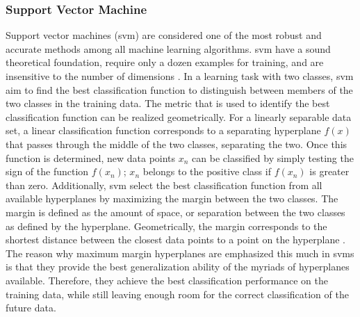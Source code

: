 \subsubsection{Support Vector Machine}
Support vector machines (\gls{svm}) are considered one of the most robust and accurate methods among all machine learning algorithms. \gls{svm} have a sound theoretical foundation, require only a dozen examples for training,
and are insensitive to the number of dimensions \cite{Wu2008}.
In a learning task with two classes, \gls{svm} aim to find the best classification function to distinguish between members of the two classes in the training data. The metric that is used to identify the best classification function can be realized geometrically. For a linearly separable
data set, a linear classification function corresponds to a separating hyperplane $f(x)$ that passes through the middle of the two classes, separating the two. Once this function is determined, new data points $x_{n}$ can be classified by simply testing the sign of the function
$f(x_{n})$; $x_{n}$ belongs to the positive class if $f(x_{n})$ is greater than zero.
Additionally, \gls{svm} select the best classification function from all available hyperplanes by maximizing the margin between the two classes.
The margin is defined as the amount of space, or separation between the two classes as defined by the hyperplane. Geometrically, the margin corresponds to the shortest distance between the closest data points to a point on the hyperplane \cite{Wu2008}. The reason why maximum margin hyperplanes are emphasized this much in \gls{svm}s is that they provide the best generalization ability of the myriads of hyperplanes available. Therefore, they achieve the best classification performance on the training data, while still leaving enough room for the correct classification of the future data.

